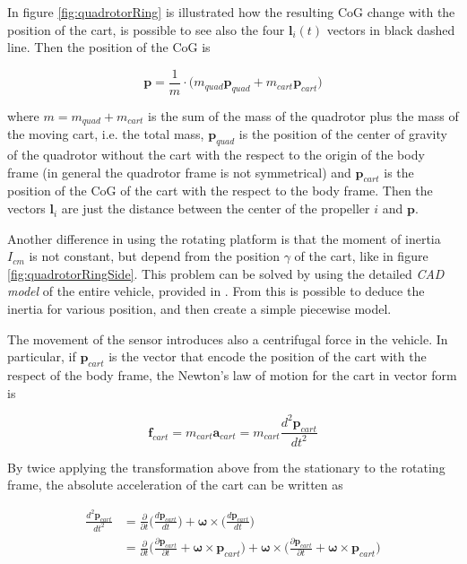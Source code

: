 \noindent In figure \ref{fig:quadrotorRing} is illustrated how the resulting CoG change with the position of the cart, is possible to see also the four $\mathbf{l}_i(t)$ vectors in black dashed line. Then the position of the CoG is

\begin{equation}
	\mathbf{p} = \frac{1}{m}\cdot \bigl(m_{quad}\mathbf{p}_{quad} + m_{cart}\mathbf{p}_{cart}\bigl)	
	\label{eq:CoG}
\end{equation}

\noindent where $m=m_{quad}+m_{cart}$ is the sum of the mass of the quadrotor plus the mass of the moving cart, i.e. the total mass, $\mathbf{p}_{quad}$ is the position of the center of gravity of the quadrotor without the cart with the respect to the origin of the body frame (in general the quadrotor frame is not symmetrical) and $\mathbf{p}_{cart}$ is the position of the CoG of the cart with the respect to the body frame. Then the vectors $\mathbf{l}_i$ are just the distance between the center of the propeller $i$ and $\mathbf{p}$.

\noindent Another difference in using the rotating platform is that the moment of inertia $I_{cm}$ is not constant, but depend from the position $\gamma$ of the cart, like in figure \ref{fig:quadrotorRingSide}. This problem can be solved by using the detailed \textit{CAD model} of the entire vehicle, provided in \cite{Carlos}. From this is possible to deduce the inertia for various position, and then create a simple piecewise model. 

\noindent The movement of the sensor introduces also a centrifugal force in the vehicle. In particular, if $\mathbf{p}_{cart}$ is the vector that encode the position of the cart with the respect of the body frame, the Newton's law of motion for the cart in vector form is 

\begin{equation}
	\mathbf{f}_{cart}=m_{cart}\mathbf{a}_{cart}=m_{cart}\frac{d^2\mathbf{p}_{cart}}{dt^2}
	\label{eq:NewtonForce}
\end{equation}

\noindent By twice applying the transformation above from the stationary to the rotating frame, the absolute acceleration of the cart can be written as \cite{physics}

\begin{align}
	\frac{d^2\mathbf{p}_{cart}}{dt^2} &= \frac{\partial}{\partial t}\Big(\frac{d\mathbf{p}_{cart}}{dt}\Big)+\boldsymbol{\omega}\times\Big(\frac{d\mathbf{p}_{cart}}{dt}\Big) \nonumber \\
	&= \frac{\partial}{\partial t}\Big(\frac{\partial\mathbf{p}_{cart}}{\partial t}+\boldsymbol{\omega}\times\mathbf{p}_{cart}\Big)+\boldsymbol{\omega}\times\Big(\frac{\partial\mathbf{p}_{cart}}{\partial t}+\boldsymbol{\omega}\times\mathbf{p}_{cart}\Big)
	\label{eq:centrifugalAcceleration}
\end{align}

